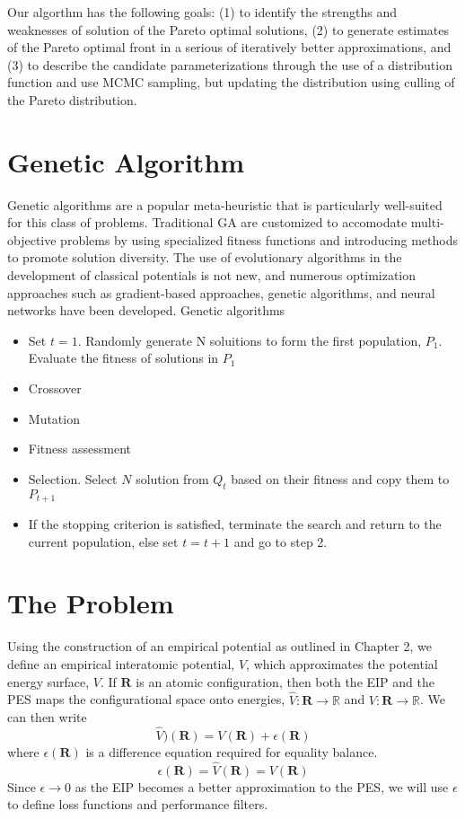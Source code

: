 Our algorthm has the following goals: (1) to identify the strengths and weaknesses of solution of the Pareto optimal solutions, (2) to generate estimates of the Pareto optimal front in a serious of iteratively better approximations, and (3) to describe the candidate parameterizations through the use of a distribution function and use MCMC sampling, but updating the distribution using culling of the Pareto distribution.

\section{Genetic Algorithm}

Genetic algorithms are a popular meta-heuristic that is particularly well-suited for this class of problems.  Traditional GA are customized to accomodate multi-objective problems by using specialized fitness functions and introducing methods to promote solution diversity.  The use of evolutionary algorithms in the development of classical potentials is not new, and numerous optimization approaches such as gradient-based approaches, genetic algorithms, and neural networks have been developed.
Genetic algorithms

\begin{itemize}
\item  Set $t=1$.  Randomly generate N soluitions to form the first population, $P_1$.  Evaluate the fitness of solutions in $P_1$
\item Crossover
\item Mutation
\item Fitness assessment
\item Selection.  Select $N$ solution from $Q_t$ based on their fitness and copy them to $P_{t+1}$
\item If the stopping criterion is satisfied, terminate the search and return to the current population, else set $t=t+1$ and go to step 2.
\end{itemize}

\section{The Problem}

Using the construction of an empirical potential as outlined in Chapter 2, we define an empirical interatomic potential, $\hat{V}$, which approximates the potential energy surface, $V$.
If $\bm{R}$ is an atomic configuration, then both the EIP and the PES maps the configurational space onto energies, $\hat{V}:\bm{R} \rightarrow \mathbb{R}$ and $V:\bm{R} \rightarrow \mathbb{R}$.
We can then write
\begin{equation}
    \hat{V})(\bm{R}) = V(\bm{R}) + \epsilon(\bm{R})
\end{equation}
where $\epsilon(\bm{R})$ is a difference equation required for equality balance.
\begin{equation}
    \epsilon(\bm{R}) = \hat{V}(\bm{R}) = V(\bm{R})
\end{equation}
Since ${\epsilon \rightarrow 0}$ as the EIP becomes a better approximation to the PES, we will use $\epsilon$ to define loss functions and performance filters.


